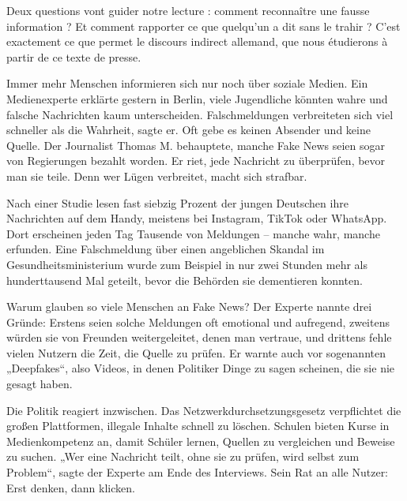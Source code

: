 \documentclass[11pt]{article}
\newcommand{\cle}[1]{{\popxbold\color{popdark}#1}}
\newcounter{popsec}
\newcounter{popsub}
\newcommand{\courssub}[1]{%
  \stepcounter{popsub}%
  \par\vspace{9pt}\noindent{\popxbold\fontsize{11.5}{13}\selectfont\color{popink}{\color{poporange}\thepopsec.\thepopsub}\hspace{6pt}#1}\par\nopagebreak\vspace{4pt}
}
\begin{document}
Deux questions vont guider notre lecture : comment \cle{reconnaître} une fausse information ? Et comment \cle{rapporter} ce que quelqu'un a dit sans le trahir ? C'est exactement ce que permet le discours indirect allemand, que nous étudierons à partir de ce texte de presse.

\courssub{Lecture globale du texte}

\begin{textebox}
Immer mehr Menschen informieren sich nur noch über soziale Medien. Ein Medienexperte erklärte gestern in Berlin, viele Jugendliche könnten wahre und falsche Nachrichten kaum unterscheiden. Falschmeldungen verbreiteten sich viel schneller als die Wahrheit, sagte er. Oft gebe es keinen Absender und keine Quelle. Der Journalist Thomas M. behauptete, manche Fake News seien sogar von Regierungen bezahlt worden. Er riet, jede Nachricht zu überprüfen, bevor man sie teile. Denn wer Lügen verbreitet, macht sich strafbar.

Nach einer Studie lesen fast siebzig Prozent der jungen Deutschen ihre Nachrichten auf dem Handy, meistens bei Instagram, TikTok oder WhatsApp. Dort erscheinen jeden Tag Tausende von Meldungen – manche wahr, manche erfunden. Eine Falschmeldung über einen angeblichen Skandal im Gesundheitsministerium wurde zum Beispiel in nur zwei Stunden mehr als hunderttausend Mal geteilt, bevor die Behörden sie dementieren konnten.

Warum glauben so viele Menschen an Fake News? Der Experte nannte drei Gründe: Erstens seien solche Meldungen oft emotional und aufregend, zweitens würden sie von Freunden weitergeleitet, denen man vertraue, und drittens fehle vielen Nutzern die Zeit, die Quelle zu prüfen. Er warnte auch vor sogenannten „Deepfakes“, also Videos, in denen Politiker Dinge zu sagen scheinen, die sie nie gesagt haben.

Die Politik reagiert inzwischen. Das Netzwerkdurchsetzungsgesetz verpflichtet die großen Plattformen, illegale Inhalte schnell zu löschen. Schulen bieten Kurse in Medienkompetenz an, damit Schüler lernen, Quellen zu vergleichen und Beweise zu suchen. „Wer eine Nachricht teilt, ohne sie zu prüfen, wird selbst zum Problem“, sagte der Experte am Ende des Interviews. Sein Rat an alle Nutzer: Erst denken, dann klicken.
\end{textebox}
\end{document}
